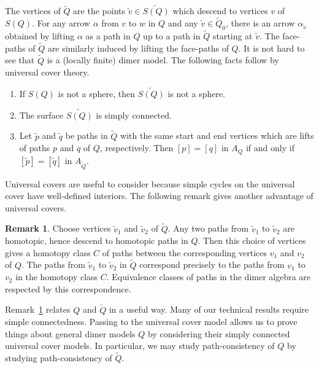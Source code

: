 \documentclass{article}
\theoremstyle{definition}
\newtheorem{remk}[thm]{Remark}
\begin{document}
The vertices of $\widetilde Q$ are the points $\tilde v\in\widetilde{S(Q)}$ which descend to vertices $v$ of $S(Q)$. For any arrow $\alpha$ from $v$ to $w$ in $Q$ and any $\tilde v\in\widetilde Q_0$, there is an arrow $\alpha_{\tilde v}$ obtained by lifting $\alpha$ as a path in $Q$ up to a path in $\widetilde Q$ starting at $\tilde v$. The face-paths of $\widetilde Q$ are similarly induced by lifting the face-paths of $Q$. It is not hard to see that $\widetilde Q$ is a (locally finite) dimer model. 
The following facts follow by universal cover theory.
\begin{enumerate}
	\item If $S(Q)$ is not a sphere, then $\widetilde{S(Q)}$ is not a sphere.
	\item The surface $\widetilde{S(Q)}$ is simply connected.
	\item Let $\tilde p$ and $\tilde q$ be paths in $\widetilde Q$ with the same start and end vertices which are lifts of paths $p$ and $q$ of $Q$, respectively. Then $[p]=[q]$ in $A_Q$ if and only if $[\tilde p]=[\tilde q]$ in $A_{\widetilde Q}$.
\end{enumerate}


Universal covers are useful to consider because simple cycles on the universal cover have well-defined interiors. The following remark gives another advantage of universal covers.



\begin{remk}\label{remk:Q-hat-Q-path-correspondence}
	Choose vertices $\tilde v_1$ and $\tilde v_2$ of $\widetilde Q$. Any two paths from $\tilde v_1$ to $\tilde v_2$ are homotopic, hence descend to homotopic paths in $Q$. Then this choice of vertices gives a homotopy class $C$ of paths between the corresponding vertices $v_1$ and $v_2$ of $Q$. The paths from $\tilde v_1$ to $\tilde v_2$ in $\widetilde Q$ correspond precisely to the paths from $v_1$ to $v_2$ in the homotopy class $C$. Equivalence classes of paths in the dimer algebra are respected by this correspondence.
\end{remk}

Remark~\ref{remk:Q-hat-Q-path-correspondence} relates $Q$ and $\widetilde Q$ in a useful way.
Many of our technical results require simple connectedness. Passing to the universal cover model allows us to prove things about general dimer models $Q$ by considering their simply connected universal cover models.
In particular, we may study path-consistency of $Q$ by studying path-consistency of $\widetilde Q$. 
\end{document}
